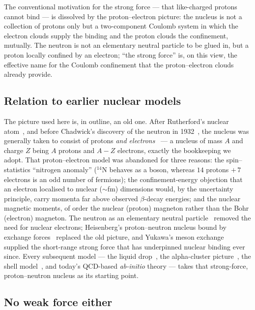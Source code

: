 \documentclass[11pt]{article}
\begin{document}
The conventional motivation for the strong force --- that like-charged protons cannot bind ---
is dissolved by the proton--electron picture: the nucleus is not a collection of protons only
but a two-component Coulomb system in which the electron clouds supply the binding and the
proton clouds the confinement, mutually. The neutron is not an elementary neutral particle to be
glued in, but a proton locally confined by an electron; ``the strong force'' is, on this view,
the effective name for the Coulomb confinement that the proton--electron clouds already provide.

\subsection{Relation to earlier nuclear models}

The picture used here is, in outline, an old one. After Rutherford's nuclear
atom~\cite{Rutherford1911}, and before Chadwick's discovery of the neutron in
1932~\cite{Chadwick1932}, the nucleus was generally taken to consist of protons \emph{and
electrons}~\cite{BetheBacher1936} --- a nucleus of mass $A$ and charge $Z$ being $A$ protons and
$A-Z$ electrons, exactly the bookkeeping we adopt. That proton--electron model was abandoned for three reasons:
the spin--statistics ``nitrogen anomaly'' ($^{14}$N behaves as a boson, whereas $14$ protons
$+\,7$ electrons is an odd number of fermions); the confinement-energy objection that an
electron localised to nuclear ($\sim$fm) dimensions would, by the uncertainty principle, carry
momenta far above observed $\beta$-decay energies; and the nuclear magnetic moments, of order
the nuclear (proton) magneton rather than the Bohr (electron) magneton. The neutron as an
elementary neutral particle~\cite{Iwanenko1932} removed the need for nuclear electrons;
Heisenberg's proton--neutron nucleus bound by exchange forces~\cite{Heisenberg1932} replaced the
old picture, and Yukawa's meson exchange~\cite{Yukawa1935} supplied the short-range strong force
that has underpinned nuclear binding ever since. Every subsequent model --- the liquid
drop~\cite{Weizsacker1935}, the alpha-cluster picture~\cite{Wheeler1937,HafstadTeller1938}, the
shell model~\cite{Mayer1949,Haxel1949}, and today's QCD-based \emph{ab-initio} theory --- takes
that strong-force, proton--neutron nucleus as its starting point.

\subsection{No weak force either}
\end{document}
